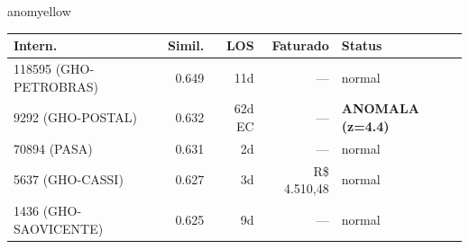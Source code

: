 \documentclass[a4paper,10pt]{article}
\begin{document}
\begin{anomalycard}[Internacao 118902 | GHO-BRADESCO | MODERADO (z=2.74)]{anomyellow}
\begin{tabular}{l r r r l}\toprule\textbf{Intern.} & \textbf{Simil.} & \textbf{LOS} & \textbf{Faturado} & \textbf{Status} \\\midrule
118595 (GHO-PETROBRAS) & 0.649 & 11d & --- & \textcolor{jcubeblue}{normal} \\
9292 (GHO-POSTAL) & 0.632 & 62d EC & --- & \textcolor{anomred}{\textbf{ANOMALA (z=4.4)}} \\
70894 (PASA) & 0.631 & 2d & --- & \textcolor{jcubeblue}{normal} \\
5637 (GHO-CASSI) & 0.627 & 3d & R\$ 4.510,48 & \textcolor{jcubeblue}{normal} \\
1436 (GHO-SAOVICENTE) & 0.625 & 9d & --- & \textcolor{jcubeblue}{normal} \\
\bottomrule\end{tabular}


\end{anomalycard}

\newpage
\end{document}
